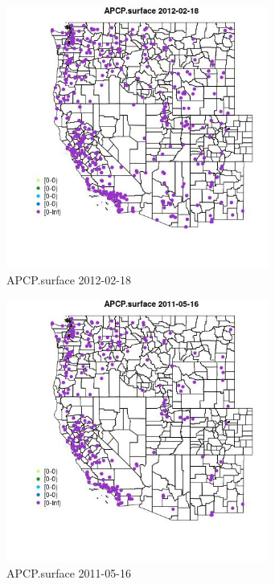 \begin{figure} 
\centering  
\includegraphics[width=0.77\textwidth]{Code_Outputs/Report_ML_input_PM25_Step4_part_f_de_duplicated_aves_prioritize_24hr_obswNAs_MapObsAPCPsurface2012-02-18.jpg} 
\caption{\label{fig:Report_ML_input_PM25_Step4_part_f_de_duplicated_aves_prioritize_24hr_obswNAsMapObsAPCPsurface2012-02-18}APCP.surface 2012-02-18} 
\end{figure} 
 

\begin{figure} 
\centering  
\includegraphics[width=0.77\textwidth]{Code_Outputs/Report_ML_input_PM25_Step4_part_f_de_duplicated_aves_prioritize_24hr_obswNAs_MapObsAPCPsurface2011-05-16.jpg} 
\caption{\label{fig:Report_ML_input_PM25_Step4_part_f_de_duplicated_aves_prioritize_24hr_obswNAsMapObsAPCPsurface2011-05-16}APCP.surface 2011-05-16} 
\end{figure} 
 

